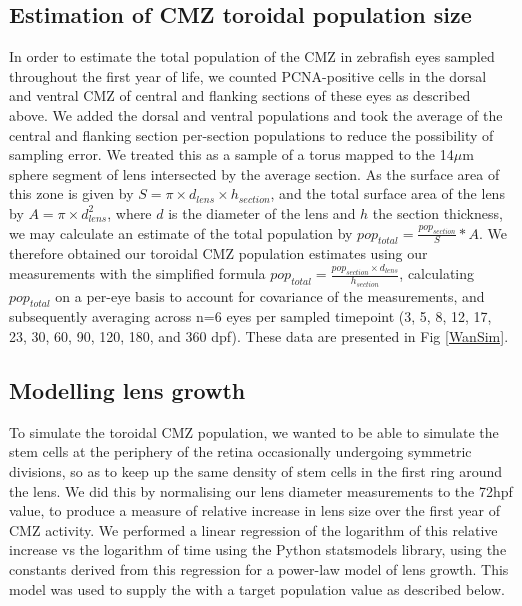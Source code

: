 \documentclass[10pt,letterpaper]{article}
\begin{document}
\subsection*{Estimation of CMZ toroidal population size}
In order to estimate the total population of the CMZ in zebrafish eyes sampled throughout the first year of life, we counted PCNA-positive cells in the dorsal and ventral CMZ of central and flanking sections of these eyes as described above. We added the dorsal and ventral populations and took the average of the central and flanking section per-section populations to reduce the possibility of sampling error. We treated this as a sample of a torus mapped to the 14$\mu$m sphere segment of lens intersected by the average section. As the surface area of this zone is given by $S = \pi \times d_{lens} \times h_{section}$, and the total surface area of the lens by $A = \pi \times d_{lens}^2$, where $d$ is the diameter of the lens and $h$ the section thickness, we may calculate an estimate of the total population by $pop_{total} = \frac{pop_{section}}{S} * A$. We therefore obtained our toroidal CMZ population estimates using our measurements with the simplified formula $pop_{total}=\frac{pop_{section} \times d_{lens}}{h_{section}}$, calculating $pop_{total}$ on a per-eye basis to account for covariance of the measurements, and subsequently averaging across n=6 eyes per sampled timepoint (3, 5, 8, 12, 17, 23, 30, 60, 90, 120, 180, and 360 dpf). These data are presented in Fig \ref{WanSim}.

\subsection*{Modelling lens growth}
To simulate the toroidal CMZ population, we wanted to be able to simulate the stem cells at the periphery of the retina occasionally undergoing symmetric divisions, so as to keep up the same density of stem cells in the first ring around the lens. We did this by normalising our lens diameter measurements to the 72hpf value, to produce a measure of relative increase in lens size over the first year of CMZ activity. We performed a linear regression of the logarithm of this relative increase vs the logarithm of time using the Python statsmodels library, using the constants derived from this regression for a power-law model of lens growth. This model was used to supply the  with a target population value as described below.
\end{document}
